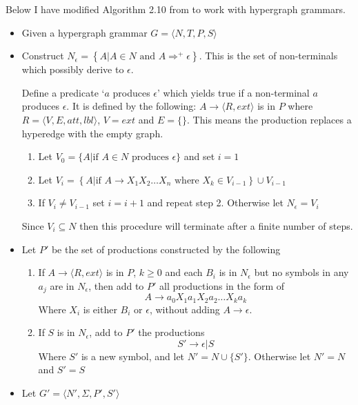 Below I have modified Algorithm 2.10 from \citet{Aho} to work with hypergraph grammars.

\begin{itemize}
\item Given a hypergraph grammar $G = \langle N, T, P, S \rangle$
\item Construct $N_\epsilon = \left\{A | A \in N \textrm{ and } A \Rightarrow^{+} \epsilon \right\}$. This is the set of non-terminals which possibly derive to $\epsilon$.

Define a predicate `$a$ produces $\epsilon$' which yields true if a non-terminal $a$ produces $\epsilon$. It is defined by the following: $A \to \langle R, ext \rangle$ is in $P$ where $R = \langle V, E, att, lbl\rangle$, $V = ext$ and $E = \{\}$. This means the production replaces a hyperedge with the empty graph.
\begin{enumerate}
\item Let $V_0 = \{A| \textrm{if $A \in N$ produces $\epsilon$}\}$ and set $i = 1$
\item Let $V_i = \left\{A| \textrm{if } A \to X_1X_2\dots X_n \textrm{ where } X_k \in V_{i-1}\right\} \cup V_{i-1}$
\item If $V_i \neq V_{i-1}$ set $i=i+1$ and repeat step 2. Otherwise let $N_\epsilon = V_i$
\end{enumerate}
Since $V_i \subseteq N$ then this procedure will terminate after a finite number of steps.
\item Let $P'$ be the set of productions constructed by the following
\begin{enumerate}
\item If $A \to \langle R, ext \rangle$ is in $P$, $k \geq 0$ and each $B_i$ is in $N_\epsilon$ but no symbols in any $a_j$ are in $N_\epsilon$, then add to $P'$ all productions in the form of
\[
A \to a_0 X_1 a_1 X_2 a_2 \dots X_k a_k
\]
Where $X_i$ is either $B_i$ or $\epsilon$, without adding $A \to \epsilon$.
\item If $S$ is in $N_\epsilon$, add to $P'$ the productions
\[S' \to \epsilon|S\]
Where $S'$ is a new symbol, and let $N' = N \cup \{S'\}$. Otherwise let $N' = N$ and $S' = S$
\end{enumerate}
\item Let $G' = \langle N', \Sigma, P', S' \rangle$
\end{itemize}

\paragraph{}

